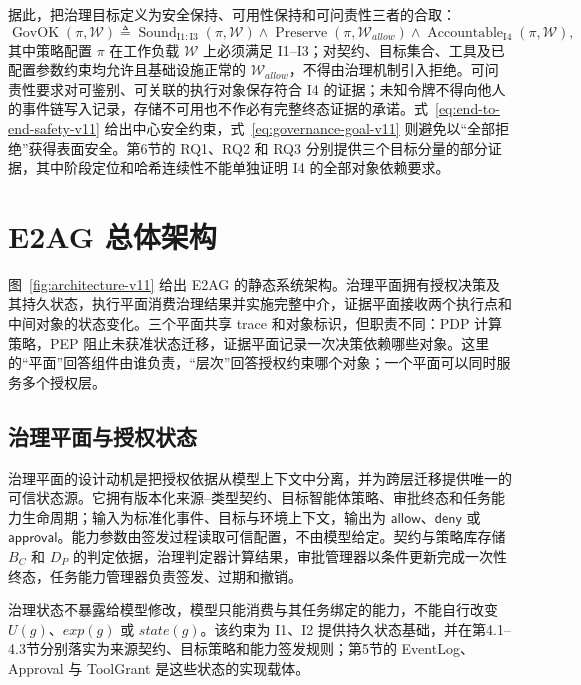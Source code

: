 据此，把治理目标定义为安全保持、可用性保持和可问责性三者的合取：
\begin{equation}
\operatorname{GovOK}(\pi,\mathcal{W})\triangleq
\operatorname{Sound}_{\mathrm{I1:I3}}(\pi,\mathcal{W})\land
\operatorname{Preserve}(\pi,\mathcal{W}_{allow})\land
\operatorname{Accountable}_{\mathrm{I4}}(\pi,\mathcal{W}),
\label{eq:governance-goal-v11}
\end{equation}
其中策略配置 $\pi$ 在工作负载 $\mathcal{W}$ 上必须满足 I1--I3；对契约、目标集合、工具及已配置参数约束均允许且基础设施正常的 $\mathcal{W}_{allow}$，不得由治理机制引入拒绝。可问责性要求对可鉴别、可关联的执行对象保存符合 I4 的证据；未知令牌不得向他人的事件链写入记录，存储不可用也不作必有完整终态证据的承诺。式~\eqref{eq:end-to-end-safety-v11} 给出中心安全约束，式~\eqref{eq:governance-goal-v11} 则避免以“全部拒绝”获得表面安全。第6节的 RQ1、RQ2 和 RQ3 分别提供三个目标分量的部分证据，其中阶段定位和哈希连续性不能单独证明 I4 的全部对象依赖要求。

\section{E2AG 总体架构}\label{sec:architecture-v11}



图~\ref{fig:architecture-v11} 给出 E2AG 的静态系统架构。治理平面拥有授权决策及其持久状态，执行平面消费治理结果并实施完整中介，证据平面接收两个执行点和中间对象的状态变化。三个平面共享 trace 和对象标识，但职责不同：PDP 计算策略，PEP 阻止未获准状态迁移，证据平面记录一次决策依赖哪些对象。这里的“平面”回答组件由谁负责，“层次”回答授权约束哪个对象；一个平面可以同时服务多个授权层。

\subsection{治理平面与授权状态}

治理平面的设计动机是把授权依据从模型上下文中分离，并为跨层迁移提供唯一的可信状态源。它拥有版本化来源--类型契约、目标智能体策略、审批终态和任务能力生命周期；输入为标准化事件、目标与环境上下文，输出为 $\mathsf{allow}$、$\mathsf{deny}$ 或 $\mathsf{approval}$。能力参数由签发过程读取可信配置，不由模型给定。契约与策略库存储 $B_C$ 和 $D_P$ 的判定依据，治理判定器计算结果，审批管理器以条件更新完成一次性终态，任务能力管理器负责签发、过期和撤销。

治理状态不暴露给模型修改，模型只能消费与其任务绑定的能力，不能自行改变 $U(g)$、$exp(g)$ 或 $state(g)$。该约束为 I1、I2 提供持久状态基础，并在第4.1--4.3节分别落实为来源契约、目标策略和能力签发规则；第5节的 EventLog、Approval 与 ToolGrant 是这些状态的实现载体。

